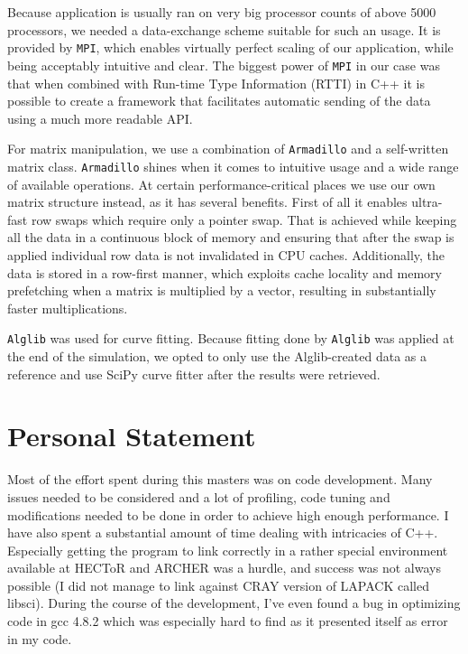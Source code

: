 \documentclass[11pt,a4paper]{article}
\begin{document}
\begin{appendices}
    Because application is usually ran on very big processor counts of above 5000 processors, we needed a data-exchange scheme suitable for such an usage.
    It is provided by \texttt{MPI}\cite{richard06}, which enables virtually perfect scaling of our application, while being acceptably intuitive and clear.
    The biggest power of \texttt{MPI} in our case was that when combined with Run-time Type Information (RTTI) in C++ it is possible to create a framework that facilitates automatic sending of the data using a much more readable API.

    For matrix manipulation, we use a combination of \texttt{Armadillo}\cite{Sanderson10} and a self-written matrix class.
    \texttt{Armadillo} shines when it comes to intuitive usage and a wide range of available operations.
    At certain performance-critical places we use our own matrix structure instead, as it has several benefits.
    First of all it enables ultra-fast row swaps which require only a pointer swap.
    That is achieved while keeping all the data in a continuous block of memory and ensuring that after the swap is applied individual row data is not invalidated in CPU caches.
    Additionally, the data is stored in a row-first manner, which exploits cache locality and memory prefetching when a matrix is multiplied by a vector, resulting in substantially faster multiplications.

    \texttt{Alglib} was used for curve fitting.
    Because fitting done by \texttt{Alglib} was applied at the end of the simulation, we opted to only use the Alglib-created data as a reference and use SciPy curve fitter after the results were retrieved.

    \section{Personal Statement}
    Most of the effort spent during this masters was on code development.
    Many issues needed to be considered and a lot of profiling, code tuning and modifications needed to be done in order to achieve high enough performance.
    I have also spent a substantial amount of time dealing with intricacies of C++.
    Especially getting the program to link correctly in a rather special environment available at HECToR and ARCHER was a hurdle, and success was not always possible (I did not manage to link against CRAY version of LAPACK called libsci).
    During the course of the development, I've even found a bug in optimizing code in gcc 4.8.2 which was especially hard to find as it presented itself as error in my code.


\end{appendices}
\end{document}
